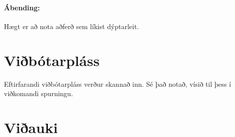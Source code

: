 \documentclass[addpoints]{exam}
\begin{document}
\begin{questions}

	\paragraph{Ábending:} Hægt er að nota aðferð sem líkist dýptarleit.


\end{questions}

\newpage

\section{Viðbótarpláss}

Eftirfarandi viðbótarpláss verður skannað inn. Sé það notað, vísið til þess í viðkomandi spurningu.


\newpage


\newpage

\section{Viðauki}
\end{document}
